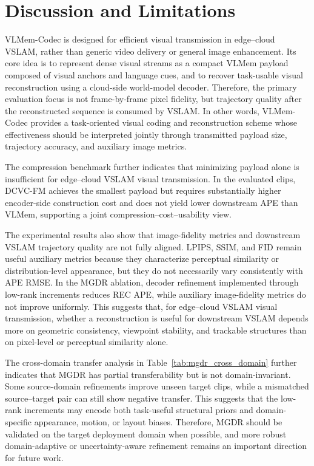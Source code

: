 \documentclass[journal]{IEEEtran}
\newcommand{\VLMemCodec}{VLMem-Codec}
\begin{document}
\FloatBarrier
\section{Discussion and Limitations}
\label{sec:discussion}

\VLMemCodec{} is designed for efficient visual transmission in edge--cloud VSLAM, rather than generic video delivery or general image enhancement. Its core idea is to represent dense visual streams as a compact VLMem payload composed of visual anchors and language cues, and to recover task-usable visual reconstruction using a cloud-side world-model decoder. Therefore, the primary evaluation focus is not frame-by-frame pixel fidelity, but trajectory quality after the reconstructed sequence is consumed by VSLAM. In other words, \VLMemCodec{} provides a task-oriented visual coding and reconstruction scheme whose effectiveness should be interpreted jointly through transmitted payload size, trajectory accuracy, and auxiliary image metrics.

The compression benchmark further indicates that minimizing payload alone is insufficient for edge--cloud VSLAM visual transmission. In the evaluated clips, DCVC-FM achieves the smallest payload but requires substantially higher encoder-side construction cost and does not yield lower downstream APE than VLMem, supporting a joint compression--cost--usability view.

The experimental results also show that image-fidelity metrics and downstream VSLAM trajectory quality are not fully aligned. LPIPS, SSIM, and FID remain useful auxiliary metrics because they characterize perceptual similarity or distribution-level appearance, but they do not necessarily vary consistently with APE RMSE. In the MGDR ablation, decoder refinement implemented through low-rank increments reduces REC APE, while auxiliary image-fidelity metrics do not improve uniformly. This suggests that, for edge--cloud VSLAM visual transmission, whether a reconstruction is useful for downstream VSLAM depends more on geometric consistency, viewpoint stability, and trackable structures than on pixel-level or perceptual similarity alone.

The cross-domain transfer analysis in Table~\ref{tab:mgdr_cross_domain} further indicates that MGDR has partial transferability but is not domain-invariant. Some source-domain refinements improve unseen target clips, while a mismatched source--target pair can still show negative transfer. This suggests that the low-rank increments may encode both task-useful structural priors and domain-specific appearance, motion, or layout biases. Therefore, MGDR should be validated on the target deployment domain when possible, and more robust domain-adaptive or uncertainty-aware refinement remains an important direction for future work.
\end{document}
